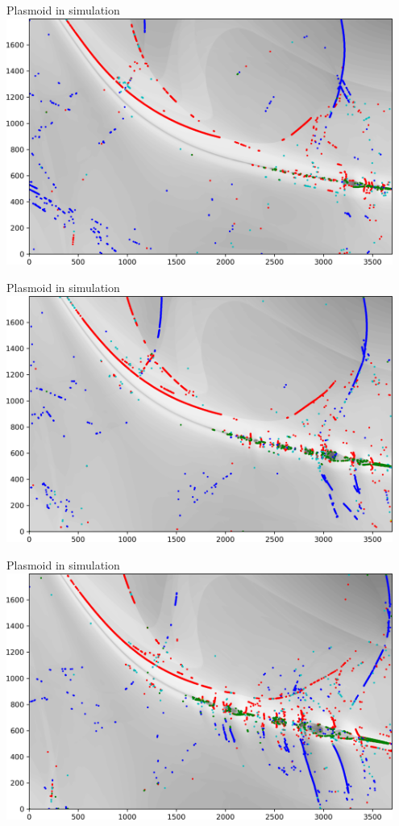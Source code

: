 \documentclass[10pt,aspectratio=169,usenames,dvipsnames]{beamer}
\begin{document}
\begin{frame}{Plasmoid in simulation}
\includegraphics[width=0.95\textwidth]{2023NAM/Figures/shocks63.png}
\end{frame}
\begin{frame}{Plasmoid in simulation}
\includegraphics[width=0.95\textwidth]{2023NAM/Figures/shocks64.png}
\end{frame}
\begin{frame}{Plasmoid in simulation}
\includegraphics[width=0.95\textwidth]{2023NAM/Figures/shocks65.png}
\end{frame}
\end{document}
